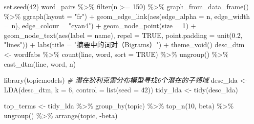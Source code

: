 \documentclass[]{tufte-book}
\newenvironment{Shaded}{}{}
\newcommand{\AttributeTok}[1]{\textcolor[rgb]{0.49,0.56,0.16}{#1}}
\newcommand{\CommentTok}[1]{\textcolor[rgb]{0.38,0.63,0.69}{\textit{#1}}}
\newcommand{\ConstantTok}[1]{\textcolor[rgb]{0.53,0.00,0.00}{#1}}
\newcommand{\DecValTok}[1]{\textcolor[rgb]{0.25,0.63,0.44}{#1}}
\newcommand{\FloatTok}[1]{\textcolor[rgb]{0.25,0.63,0.44}{#1}}
\newcommand{\FunctionTok}[1]{\textcolor[rgb]{0.02,0.16,0.49}{#1}}
\newcommand{\NormalTok}[1]{#1}
\newcommand{\OtherTok}[1]{\textcolor[rgb]{0.00,0.44,0.13}{#1}}
\newcommand{\SpecialCharTok}[1]{\textcolor[rgb]{0.25,0.44,0.63}{#1}}
\newcommand{\StringTok}[1]{\textcolor[rgb]{0.25,0.44,0.63}{#1}}
\begin{document}
\begin{Shaded}
\begin{Highlighting}[]
\FunctionTok{set.seed}\NormalTok{(}\DecValTok{42}\NormalTok{)}
\NormalTok{word\_pairs }\SpecialCharTok{\%\textgreater{}\%}
  \FunctionTok{filter}\NormalTok{(n }\SpecialCharTok{\textgreater{}=} \DecValTok{150}\NormalTok{) }\SpecialCharTok{\%\textgreater{}\%}
  \FunctionTok{graph\_from\_data\_frame}\NormalTok{() }\SpecialCharTok{\%\textgreater{}\%}
  \FunctionTok{ggraph}\NormalTok{(}\AttributeTok{layout =} \StringTok{"fr"}\NormalTok{) }\SpecialCharTok{+}
  \FunctionTok{geom\_edge\_link}\NormalTok{(}\FunctionTok{aes}\NormalTok{(}\AttributeTok{edge\_alpha =}\NormalTok{ n, }\AttributeTok{edge\_width =}\NormalTok{ n), }\AttributeTok{edge\_colour =} \StringTok{"cyan4"}\NormalTok{) }\SpecialCharTok{+}
  \FunctionTok{geom\_node\_point}\NormalTok{(}\AttributeTok{size =} \DecValTok{1}\NormalTok{) }\SpecialCharTok{+}
  \FunctionTok{geom\_node\_text}\NormalTok{(}\FunctionTok{aes}\NormalTok{(}\AttributeTok{label =}\NormalTok{ name), }\AttributeTok{repel =} \ConstantTok{TRUE}\NormalTok{, }
                 \AttributeTok{point.padding =} \FunctionTok{unit}\NormalTok{(}\FloatTok{0.2}\NormalTok{, }\StringTok{"lines"}\NormalTok{)) }\SpecialCharTok{+}
  \FunctionTok{labs}\NormalTok{(}\AttributeTok{title =} \StringTok{"摘要中的词对（Bigrams）"}\NormalTok{) }\SpecialCharTok{+}
  \FunctionTok{theme\_void}\NormalTok{()}
\NormalTok{desc\_dtm }\OtherTok{\textless{}{-}}\NormalTok{ wordfabs }\SpecialCharTok{\%\textgreater{}\%}
        \FunctionTok{count}\NormalTok{(line, word, }\AttributeTok{sort =} \ConstantTok{TRUE}\NormalTok{) }\SpecialCharTok{\%\textgreater{}\%}
        \FunctionTok{ungroup}\NormalTok{() }\SpecialCharTok{\%\textgreater{}\%}
        \FunctionTok{cast\_dtm}\NormalTok{(line, word, n)}

\FunctionTok{library}\NormalTok{(topicmodels)}
\CommentTok{\# 潜在狄利克雷分布模型寻找6个潜在的子领域}
\NormalTok{desc\_lda }\OtherTok{\textless{}{-}} \FunctionTok{LDA}\NormalTok{(desc\_dtm, }\AttributeTok{k =} \DecValTok{6}\NormalTok{, }\AttributeTok{control =} \FunctionTok{list}\NormalTok{(}\AttributeTok{seed =} \DecValTok{42}\NormalTok{))}
\NormalTok{tidy\_lda }\OtherTok{\textless{}{-}} \FunctionTok{tidy}\NormalTok{(desc\_lda)}

\NormalTok{top\_terms }\OtherTok{\textless{}{-}}\NormalTok{ tidy\_lda }\SpecialCharTok{\%\textgreater{}\%}
  \FunctionTok{group\_by}\NormalTok{(topic) }\SpecialCharTok{\%\textgreater{}\%}
  \FunctionTok{top\_n}\NormalTok{(}\DecValTok{10}\NormalTok{, beta) }\SpecialCharTok{\%\textgreater{}\%}
  \FunctionTok{ungroup}\NormalTok{() }\SpecialCharTok{\%\textgreater{}\%}
  \FunctionTok{arrange}\NormalTok{(topic, }\SpecialCharTok{{-}}\NormalTok{beta)}


\end{Highlighting}
\end{Shaded}
\end{document}
